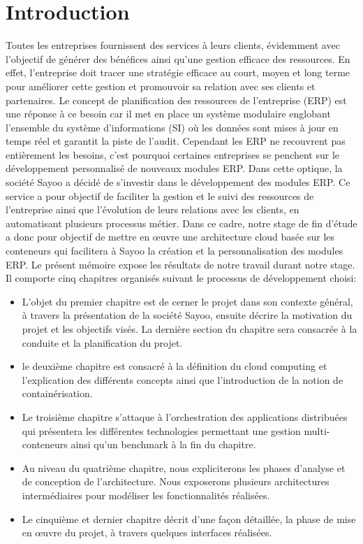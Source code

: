 \chapter*{Introduction}

\begin{onehalfspace}
Toutes les entreprises fournissent des services à leurs clients, évidemment avec l’objectif de générer des bénéfices ainsi qu'une gestion efficace des ressources. En effet, l'entreprise doit tracer une stratégie efficace au court, moyen et long terme pour améliorer cette gestion  et promouvoir sa relation avec ses clients et partenaires. Le concept de planification des ressources de l'entreprise (ERP) est une réponse à ce besoin  car il met en place un système modulaire englobant l'ensemble du système d'informations (SI) où les données sont mises à jour en temps réel et garantit la piste de l'audit. Cependant les ERP ne recouvrent pas entièrement les besoins, c'est pourquoi certaines entreprises se penchent sur le développement personnalisé de nouveaux modules ERP. 
\newline
Dans cette optique, la société Sayoo a décidé de s’investir dans le développement des modules ERP. Ce service  a pour objectif de faciliter la gestion et le suivi des ressources de l'entreprise ainsi que l'évolution de leurs relations avec les clients, en automatisant plusieurs processus métier. Dans ce cadre, notre stage de fin d'étude a donc pour objectif de mettre en œuvre une architecture cloud basée sur les conteneurs qui facilitera à Sayoo la création et la personnalisation des modules ERP.
\newline
Le présent mémoire expose les résultats de notre travail durant notre stage. Il comporte cinq chapitres organisés suivant le processus de développement choisi:
\begin{itemize}
\item L’objet du premier chapitre est de cerner le projet dans son contexte général, à travers la présentation de la société Sayoo, ensuite décrire la motivation du projet et les objectifs visés. La dernière section du chapitre sera consacrée à la conduite et la planification du projet.
\item le deuxième chapitre est consacré à la définition du cloud computing et l'explication des différents concepts ainsi que l'introduction de la notion de containérisation. 
\item Le troisième chapitre s'attaque à l'orchestration des applications distribuées qui présentera les différentes technologies permettant une gestion multi-conteneurs ainsi qu'un benchmark à la fin du chapitre.
\item Au niveau du quatrième chapitre, nous expliciterons les phases d’analyse et de conception de l'architecture. Nous exposerons plusieurs architectures intermédiaires pour modéliser les fonctionnalités réalisées.
\item Le cinquième et dernier chapitre décrit d’une façon détaillée, la phase de mise en œuvre du projet, à travers quelques interfaces réalisées.
\end{itemize}


\end{onehalfspace}
